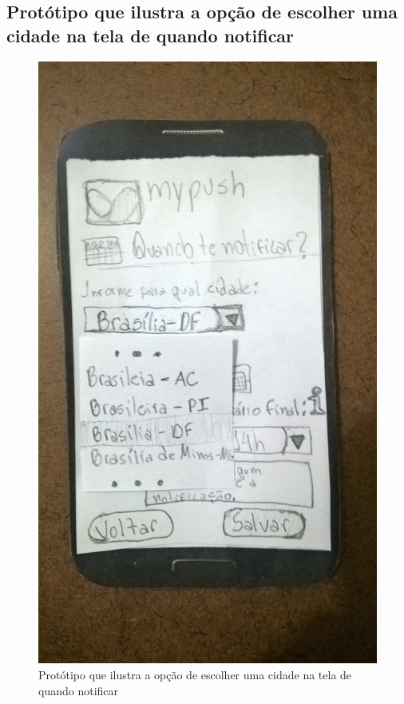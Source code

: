 \begin{anexosenv}
  \pagebreak
  \section*{Protótipo que ilustra a opção de escolher uma cidade na tela de quando notificar}

    \begin{figure}[!htbp]
      \centering
      \includegraphics[scale=0.32, angle=-90]{editaveis/figuras/prototipo_papel_v2/quando_notificar_cidade}
      \caption{Protótipo que ilustra a opção de escolher uma cidade na tela de quando notificar}
      \label{quando_notificar_cidade_v2}
    \end{figure}
    

\end{anexosenv}
